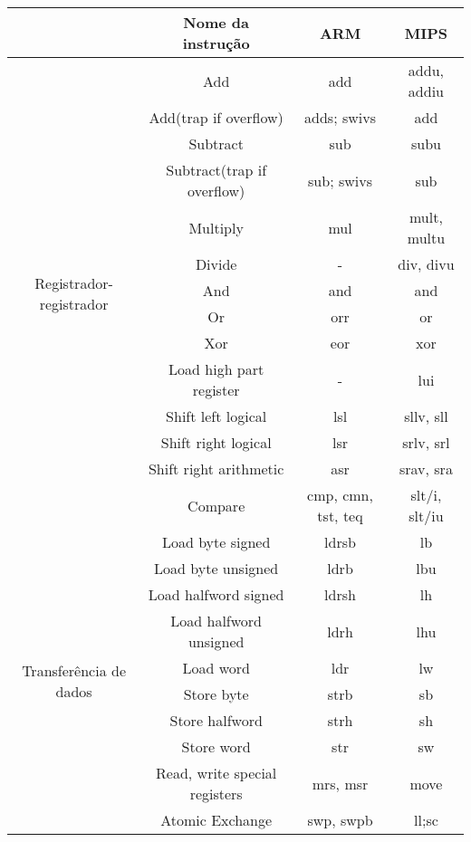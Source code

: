 \begin{table}[h]
	\begin{tabular}{c|c|c|c}
		& \textbf{Nome da instrução} & \textbf{ARM}& \textbf{MIPS} \\\hline
		\multirow{14}[0]{*}{Registrador-registrador} & Add   & add   & addu, addiu \\
		& Add(trap if overflow) & adds; swivs & add \\
		& Subtract & sub   & subu \\
		& Subtract(trap if overflow) & sub; swivs & sub \\
		& Multiply & mul   & mult, multu \\
		& Divide & -     & div, divu \\
		& And   & and   & and \\
		&  Or   & orr   & or \\
		& Xor   & eor   & xor \\
		& Load high part register & -     & lui \\
		& Shift left logical & lsl   & sllv, sll \\
		& Shift right logical & lsr   & srlv, srl \\
		& Shift right arithmetic & asr   & srav, sra \\
		& Compare & cmp, cmn, tst, teq & slt/i, slt/iu \\\hline
		\multirow{10}[0]{*}{Transferência de dados} & Load byte signed & ldrsb & lb \\
		& Load byte unsigned & ldrb  & lbu \\
		& Load halfword signed & ldrsh & lh \\
		& Load halfword unsigned & ldrh  & lhu \\
		& Load word & ldr   & lw \\
		& Store byte & strb  & sb \\
		& Store halfword & strh  & sh \\
		& Store word & str   & sw \\
		& Read, write special registers & mrs, msr & move \\
		& Atomic Exchange & swp, swpb & ll;sc \\
	\end{tabular}%
\end{table}%

